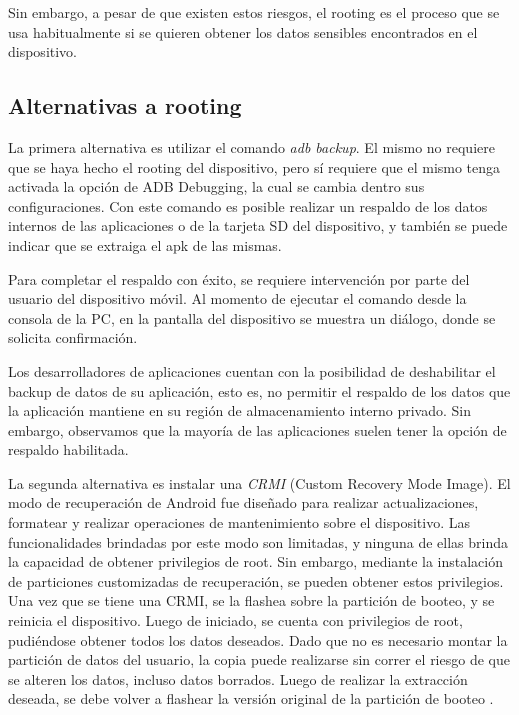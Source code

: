 Sin embargo, a pesar de que existen estos riesgos, el rooting es el proceso que se usa habitualmente si se quieren obtener los datos sensibles encontrados en el dispositivo.

\subsection{Alternativas a rooting}
\label{alternativasRooting}

La primera alternativa es utilizar el comando \emph{adb backup}. El mismo no requiere que se haya hecho el rooting del dispositivo, pero sí requiere que el mismo tenga activada la opción de ADB Debugging, la cual se cambia dentro sus configuraciones. Con este comando es posible realizar un respaldo de los datos internos de las aplicaciones o de la tarjeta SD del dispositivo, y también se puede indicar que se extraiga el apk de las mismas.

Para completar el respaldo con éxito, se requiere intervención por parte del usuario del dispositivo móvil. Al momento de ejecutar el comando desde la consola de la PC, en la pantalla del dispositivo se muestra un diálogo, donde se solicita confirmación.

Los desarrolladores de aplicaciones cuentan con la posibilidad de deshabilitar el backup de datos de su aplicación, esto es, no permitir el respaldo de los datos que la aplicación mantiene en su región de almacenamiento interno privado. Sin embargo, observamos que la mayoría de las aplicaciones suelen tener la opción de respaldo habilitada.

La segunda alternativa es instalar una \emph{CRMI} (Custom Recovery Mode Image). El modo de recuperación de Android fue diseñado para realizar actualizaciones, formatear y realizar operaciones de mantenimiento sobre el dispositivo. Las funcionalidades brindadas por este modo son limitadas, y ninguna de ellas brinda la capacidad de obtener privilegios de root. Sin embargo, mediante la instalación de particiones customizadas de recuperación, se pueden obtener estos privilegios. 
Una vez que se tiene una CRMI, se la flashea sobre la partición de booteo, y se reinicia el dispositivo. Luego de iniciado, se cuenta con privilegios de root, pudiéndose obtener todos los datos deseados. Dado que no es necesario montar la partición de datos del usuario, la copia puede realizarse sin correr el riesgo de que se alteren los datos, incluso datos borrados. Luego de realizar la extracción deseada, se debe volver a flashear la versión original de la partición de booteo \cite{dataintegr}.